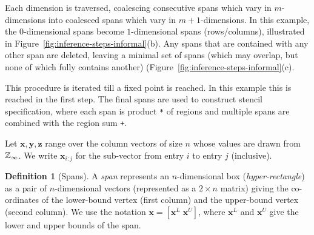 \documentclass[9pt]{sigplanconf}
\newcounter{block}
\theoremstyle{definition}
\newtheorem{definition}[block]{Definition}
\newcommand{\vect}[1]{\textbf{#1}}
\begin{document}
%
Each dimension is traversed, coalescing consecutive spans
which vary in $m$-dimensions into coalesced spans which vary in
$m+1$-dimensions. In this example, the $0$-dimensional spans
 become $1$-dimensional spans (rows/columns), illustrated
in Figure~\ref{fig:inference-steps-informal}(b).
Any spans that are contained with any other span are deleted,
leaving a minimal set of spans (which may overlap, but none of which
fully contains another) (Figure~\ref{fig:inference-steps-informal}(c).

This procedure is iterated till a fixed point is reached. In this
example this is reached in the first step. The final spans
are used to construct stencil specification, where
each span is product \texttt{*} of regions and multiple spans are
combined with the region sum \texttt{+}.

\newcommand{\spanOp}{\textsf{spans}}

Let $\vect{x}, \vect{y}, \vect{z}$ range over the column vectors of size
$n$ whose values are drawn from $\mathbb{Z}_\infty{}$.
We write $\vect{x}_{i:j}$ for the sub-vector from entry $i$ to
entry $j$ (inclusive).

\begin{definition}[Spans]
  A \emph{span} represents an $n$-dimensional box (\emph{hyper-rectangle}) as
  a pair of $n$-dimensional vectors (represented as a $2 \times n$
  matrix) giving the co-ordinates of the lower-bound vertex (first
  column) and the upper-bound vertex (second column). We use the
  notation $\vect{x} = [\vect{x}^L \; \vect{x}^U]$, where $\vect{x}^L$
  and $\vect{x}^U$ give the lower and upper bounds of the span.
\end{definition}
\end{document}
